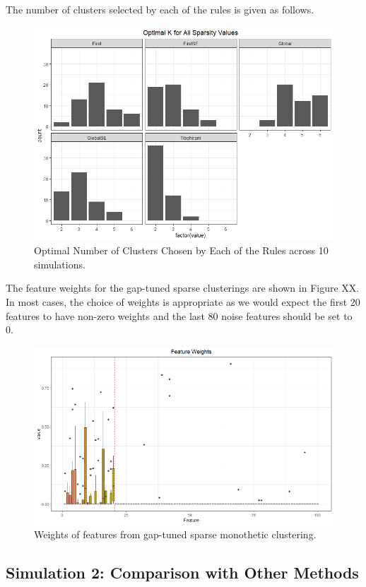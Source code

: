 \documentclass[
]{article}
\begin{document}
The number of clusters selected by each of the rules is given as
follows.

\begin{figure}
\includegraphics[width=0.9\linewidth]{OptimalKPlot} \caption{Optimal Number of Clusters Chosen by Each of the Rules across 10 simulations.}\label{fig:NumClust}
\end{figure}

The feature weights for the gap-tuned sparse clusterings are shown in
Figure XX. In most cases, the choice of weights is appropriate as we
would expect the first 20 features to have non-zero weights and the last
80 noise features should be set to 0.

\begin{figure}
\includegraphics[width=0.9\linewidth]{Feature_Weights_425sims} \caption{Weights of features from gap-tuned sparse monothetic clustering.}\label{fig:FeatureWeights}
\end{figure}

\hypertarget{simulation-2-comparison-with-other-methods}{%
\subsection{Simulation 2: Comparison with Other
Methods}\label{simulation-2-comparison-with-other-methods}}
\end{document}
